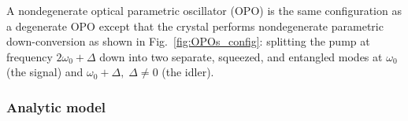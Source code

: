 
A nondegenerate optical parametric oscillator (OPO) is the same configuration as a degenerate OPO except that the crystal performs nondegenerate parametric down-conversion as shown in Fig.~\ref{fig:OPOs_config}: splitting the pump at frequency $2\omega_0+\Delta$ down into two separate, squeezed, and entangled modes at $\omega_0$ (the signal) and $\omega_0+\Delta,\; \Delta\neq0$ (the idler). %

\subsubsection{Analytic model}


